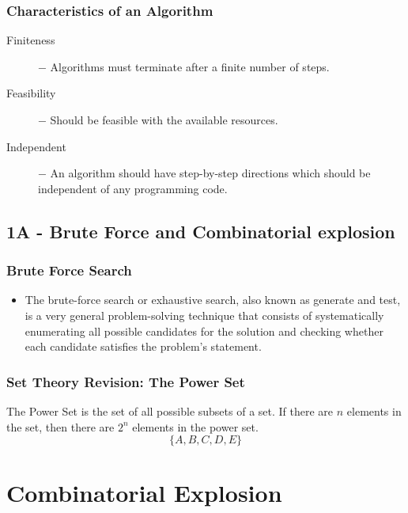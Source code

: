 \documentclass{beamer}
\begin{document}
\begin{frame}
	\frametitle{Characteristics of an Algorithm}		
	\begin{description}
		\item[Finiteness] − Algorithms must terminate after a finite number of steps.
		
		\item[Feasibility] − Should be feasible with the available resources.
		
		\item[Independent] − An algorithm should have step-by-step directions which should be independent of any programming code.
	\end{description}
\end{frame}
\subsection{1A - Brute Force and Combinatorial explosion}
\begin{frame}
	\frametitle{Brute Force Search}
	\begin{itemize}
		\item The brute-force search or exhaustive search, also known as generate and test, is a very general problem-solving technique that consists of systematically enumerating all possible candidates for the solution and checking whether each candidate satisfies the problem's statement.
	\end{itemize}
\end{frame}


\begin{frame}
	\frametitle{Set Theory Revision: The Power Set}
	The Power Set is the set of all possible subsets of a set. If there are $n$ elements in the set, then there are $2^n$ elements in the power set.
	\[ \{A,B,C,D,E\}\]
\end{frame}
\section{Combinatorial Explosion}
\end{document}
